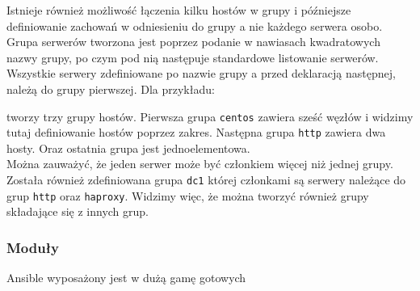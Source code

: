 Istnieje również możliwość łączenia kilku hostów w grupy i późniejsze definiowanie zachowań w odniesieniu do grupy a nie każdego serwera osobo.
Grupa serwerów tworzona jest poprzez podanie w nawiasach kwadratowych nazwy grupy, po czym pod nią następuje standardowe listowanie serwerów.
Wszystkie serwery zdefiniowane po nazwie grupy a przed deklaracją następnej, należą do grupy pierwszej.
Dla przykładu:

tworzy trzy grupy hostów.
Pierwsza grupa \texttt{centos} zawiera sześć węzłów i widzimy tutaj definiowanie hostów poprzez zakres.
Następna grupa \texttt{http} zawiera dwa hosty.
Oraz ostatnia grupa jest jednoelementowa.\\
Można zauważyć, że jeden serwer może być członkiem więcej niż jednej grupy.\\
Została również zdefiniowana grupa \texttt{dc1} której członkami są serwery należące do grup \texttt{http} oraz \texttt{haproxy}.
Widzimy więc, że można tworzyć również grupy składające się z innych grup.
\subsubsection{Moduły}
Ansible wyposażony jest w dużą gamę gotowych

